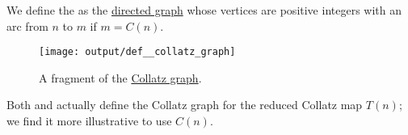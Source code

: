 \begin{definition}\label{def:collatz_graph}
  We define the  as the \hyperref[def:directed_graph]{directed graph} whose vertices are positive integers with an arc from \( n \) to \( m \) if \( m = C(n) \).

  \begin{figure}[!ht]
    \centering
    \texttt{[image: output/def\_\_collatz\_graph]}
    \caption{A fragment of the \hyperref[def:collatz_graph]{Collatz graph}.}\label{fig:def:collatz_graph}
  \end{figure}
\end{definition}
\begin{comments}
  \item Both  and  actually define the Collatz graph for the reduced Collatz map \( T(n) \); we find it more illustrative to use \( C(n) \).
\end{comments}

